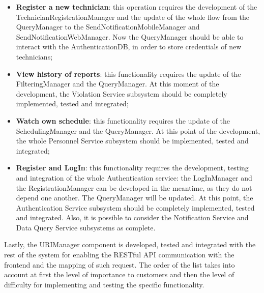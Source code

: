 \begin{itemize}
    \item \textbf{Register a new technician}: this operation requires the development of the TechnicianRegistrationManager and the update of the whole flow from the QueryManager to the SendNotificationMobileManager and SendNotificationWebManager. Now the QueryManager should be able to interact with the AuthenticationDB, in order to store credentials of new technicians;
    \item \textbf{View history of reports}: this functionality requires the update of the FilteringManager and the QueryManager.  At this moment of the development, the Violation Service subsystem should be completely implemented, tested and integrated;
    \item \textbf{Watch own schedule}: this functionality requires the update of the SchedulingManager and the QueryManager. At this point of the development, the whole Personnel Service subsystem should be implemented, tested and integrated;
    \item \textbf{Register and LogIn}: this functionality requires the development, testing and integration of the whole Authentication service: the LogInManager and the RegistrationManager can be developed in the meantime, as they do not depend one another. The QueryManager will be updated. At this point, the Authentication Service subsystem should be completely implemented, tested and integrated. Also, it is possible to consider the Notification Service and Data Query Service subsystems as complete.
\end{itemize}
Lastly, the URIManager component is developed, tested and integrated with the rest of the system for enabling the RESTful API communication with the frontend and the mapping of such request.
The order of the list takes into account at first the level of importance to customers and then the level of difficulty for implementing and testing the specific functionality.

